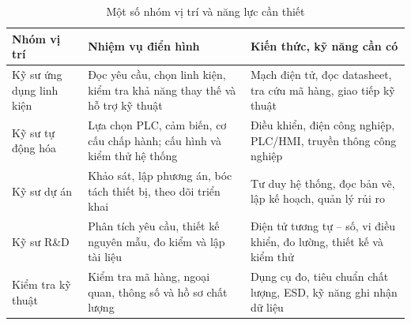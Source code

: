 \begin{table}[htbp]
\centering
\caption{Một số nhóm vị trí và năng lực cần thiết}
\label{tab:positions}
\small
\renewcommand{\arraystretch}{1.08}
\begin{tabularx}{\textwidth}{>{\raggedright\arraybackslash}p{3.1cm}
                  >{\raggedright\arraybackslash}X
                  >{\raggedright\arraybackslash}X}
\toprule
\textbf{Nhóm vị trí} & \textbf{Nhiệm vụ điển hình} & \textbf{Kiến thức, kỹ năng cần có} \\
\midrule
Kỹ sư ứng dụng linh kiện & Đọc yêu cầu, chọn linh kiện, kiểm tra khả năng thay thế và hỗ trợ kỹ thuật & Mạch điện tử, đọc datasheet, tra cứu mã hàng, giao tiếp kỹ thuật \\
\addlinespace
Kỹ sư tự động hóa & Lựa chọn PLC, cảm biến, cơ cấu chấp hành; cấu hình và kiểm thử hệ thống & Điều khiển, điện công nghiệp, PLC/HMI, truyền thông công nghiệp \\
\addlinespace
Kỹ sư dự án & Khảo sát, lập phương án, bóc tách thiết bị, theo dõi triển khai & Tư duy hệ thống, đọc bản vẽ, lập kế hoạch, quản lý rủi ro \\
\addlinespace
Kỹ sư R\&D & Phân tích yêu cầu, thiết kế nguyên mẫu, đo kiểm và lập tài liệu & Điện tử tương tự -- số, vi điều khiển, đo lường, thiết kế và kiểm thử \\
\addlinespace
Kiểm tra kỹ thuật & Kiểm tra mã hàng, ngoại quan, thông số và hồ sơ chất lượng & Dụng cụ đo, tiêu chuẩn chất lượng, ESD, kỹ năng ghi nhận dữ liệu \\
\bottomrule
\end{tabularx}
\end{table}
